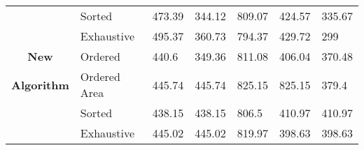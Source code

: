 \begin{table}[hp]
\begin{tabular}{|l|l|l|l|l|l|l|}
\cline{2-7}
\multicolumn{1}{|c|}{} & Sorted & 473.39 & 344.12 & 809.07 & 424.57 & 335.67 \\ 
\cline{2-7}
\multicolumn{1}{|c|}{} & Exhaustive & 495.37 & 360.73 & 794.37 & 429.72 & 299 \\ 
\hline
\multicolumn{1}{|c|}{\textbf{New}} & Ordered & 440.6
 & 349.36
 & 811.08
 & 406.04
 & 370.48
 \\ 
\cline{2-7}
\multicolumn{1}{|c|}{\textbf{Algorithm}} & Ordered Area & 445.74
 & 445.74
 & 825.15
 & 825.15
 & 379.4
 \\ 
\cline{2-7}
\multicolumn{1}{|c|}{} & Sorted & 438.15
 & 438.15
 & 806.5
 & 410.97
 & 410.97
 \\ 
\cline{2-7}
\multicolumn{1}{|c|}{} & Exhaustive & 445.02
 & 445.02
 & 819.97
 & 398.63
 & 398.63
 \\ 
\hline
\end{tabular}
\end{table}
